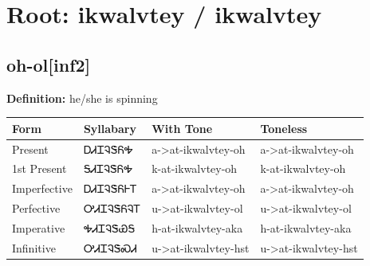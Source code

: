 \documentclass{article}%
\begin{document}
%
\normalsize%
\section*{Root: ikwalvtey / ikwalvtey}%
\subsection*{oh-ol[inf2]}%
\textbf{Definition: }%
he/she is spinning%
\\[0.5em]%
\begin{tabular}{|l|l|l|l|}%
\hline%
\textbf{Form}&\textbf{Syllabary}&\textbf{With Tone}&\textbf{Toneless}\\%
\hline%
Present&ᎠᏗᏆᎸᏕᏲᎭ&a{-}>at{-}ikwalvtey{-}oh&a{-}>at{-}ikwalvtey{-}oh\\%
1st Present&ᎦᏗᏆᎸᏕᏲᎭ&k{-}at{-}ikwalvtey{-}oh&k{-}at{-}ikwalvtey{-}oh\\%
Imperfective&ᎠᏗᏆᎸᏕᏲᎰᎢ&a{-}>at{-}ikwalvtey{-}oh&a{-}>at{-}ikwalvtey{-}oh\\%
Perfective&ᎤᏗᏆᎸᏕᏲᎸᎢ&u{-}>at{-}ikwalvtey{-}ol&u{-}>at{-}ikwalvtey{-}ol\\%
Imperative&ᎭᏗᏆᎸᏕᏯᎦ&h{-}at{-}ikwalvtey{-}aka&h{-}at{-}ikwalvtey{-}aka\\%
Infinitive&ᎤᏗᏆᎸᏕᏍᏗ&u{-}>at{-}ikwalvtey{-}hst&u{-}>at{-}ikwalvtey{-}hst\\%
\hline%
\end{tabular}%
\\[1em]%
\end{document}
